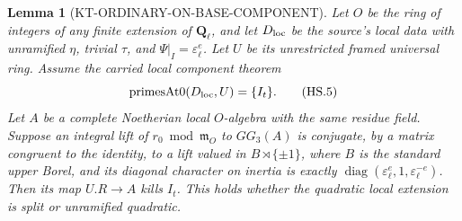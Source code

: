 \documentclass[11pt,a4paper]{article}
\newtheorem{lemma}[theorem]{Lemma}
\theoremstyle{definition}
\begin{document}
\begin{lemma}[KT-ORDINARY-ON-BASE-COMPONENT]
Let $O$ be the ring of integers of any finite extension of
$\mathbf Q_\ell$,
and let $D_{\rm loc}$ be the source's local data with unramified
$\eta$, trivial $\tau$, and $\Psi|_I=\varepsilon_\ell^e$.
Let $U$ be its unrestricted framed universal ring.  Assume the
carried local component theorem
\[
 \mathrm{primesAt0}(D_{\rm loc},U)=\{I_t\}.                  \tag{HS.5}
\]
Let $A$ be a complete Noetherian local $O$-algebra with the same
residue field.  Suppose an integral lift of $r_0\bmod\mathfrak m_O$
to $GG_3(A)$ is conjugate, by a matrix congruent to the identity,
to a lift valued in $B\rtimes\{\pm1\}$, where $B$ is the standard
upper Borel, and its diagonal character on inertia is exactly
$\operatorname{diag}(\varepsilon_\ell^e,1,
\varepsilon_\ell^{-e})$.  Then its map $U.R\to A$ kills $I_t$.
This holds whether the quadratic local extension is split or
unramified quadratic.
\end{lemma}
\end{document}
